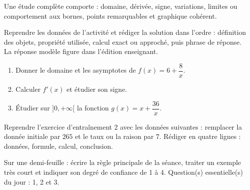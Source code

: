 \begin{traceecrite}Une étude complète comporte : domaine, dérivée, signe, variations, limites ou comportement aux bornes, points remarquables et graphique cohérent.\end{traceecrite}

\begin{exemple}
Reprendre les données de l'activité et rédiger la solution dans l'ordre : définition des objets, propriété utilisée, calcul exact ou approché, puis phrase de réponse. La réponse modèle figure dans l'édition enseignant.
\end{exemple}

\begin{exercice}[-- essentiel]
\begin{enumerate}\item Donner le domaine et les asymptotes de $f(x)=6+\dfrac{8}x$.\item Calculer $f'(x)$ et étudier son signe.\item Étudier sur $]0,+\infty[$ la fonction $g(x)=x+\dfrac{36}x$.\end{enumerate}
\end{exercice}


\begin{dm}Reprendre l'exercice d'entraînement 2 avec les données suivantes : remplacer la donnée initiale par $265$ et le taux ou la raison par $7$. Rédiger en quatre lignes : données, formule, calcul, conclusion.\end{dm}

\begin{sortie}Sur une demi-feuille : écrire la règle principale de la séance, traiter un exemple très court et indiquer son degré de confiance de 1 à 4. Question(s) essentielle(s) du jour : 1, 2 et 3.\end{sortie}

